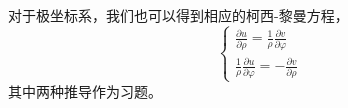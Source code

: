 对于极坐标系，我们也可以得到相应的柯西-黎曼方程，
\begin{equation}
    \left\{\begin{array}{l}
    \frac{\partial u}{\partial \rho}=\frac{1}{\rho} \frac{\partial v}{\partial \varphi} \\
    \frac{1}{\rho} \frac{\partial u}{\partial \varphi}=-\frac{\partial v}{\partial \rho}
    \end{array}\right.
    \end{equation}
其中两种推导作为习题。
